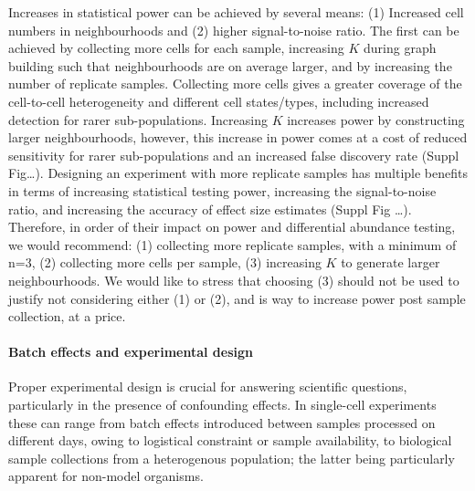 \documentclass[
]{article}
\begin{document}
Increases in statistical power can be achieved by several means: (1) Increased cell numbers in neighbourhoods and (2) higher signal-to-noise ratio. The first can
be achieved by collecting more cells for each sample, increasing \(K\) during graph building such that neighbourhoods are on average larger, and by increasing the
number of replicate samples. Collecting more cells gives a greater coverage of the cell-to-cell heterogeneity and different cell states/types, including increased
detection for rarer sub-populations. Increasing \(K\) increases power by constructing larger neighbourhoods, however, this increase in power comes at a cost of
reduced sensitivity for rarer sub-populations and an increased false discovery rate (Suppl Fig\ldots). Designing an experiment with more replicate samples has
multiple benefits in terms of increasing statistical testing power, increasing the signal-to-noise ratio, and increasing the accuracy of effect size estimates
(Suppl Fig \ldots). Therefore, in order of their impact on power and differential abundance testing, we would recommend: (1) collecting more replicate samples, with
a minimum of n=3, (2) collecting more cells per sample, (3) increasing \(K\) to generate larger neighbourhoods. We would like to stress that choosing (3) should not
be used to justify not considering either (1) or (2), and is way to increase power post sample collection, at a price.

\hypertarget{batch-effects-and-experimental-design}{%
\paragraph*{Batch effects and experimental design}\label{batch-effects-and-experimental-design}}

Proper experimental design is crucial for answering scientific questions, particularly in the presence of confounding effects. In single-cell experiments these
can range from batch effects introduced between samples processed on different days, owing to logistical constraint or sample availability, to biological sample
collections from a heterogenous population; the latter being particularly apparent for non-model organisms.
\end{document}
